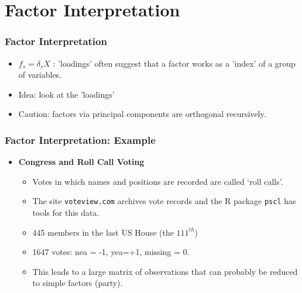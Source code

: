 \documentclass[
  shownotes,
  xcolor={svgnames},
  hyperref={colorlinks,citecolor=DarkBlue,linkcolor=DarkRed,urlcolor=DarkBlue}
  , aspectratio=169]{beamer}
\newcommand{\theme}{\color{andesred}}
\newcommand{\gr}{\color{black!60}}
\newcommand{\nv}{\color{Navy}}
\begin{document}
\section{Factor Interpretation}
\begin{frame}
\frametitle{Factor Interpretation}

\begin{itemize}
\item $f_s = \delta_s X$ : 'loadings' often suggest that a factor works as a 'index' of a group of variables.
\bigskip
\item Idea: look at the 'loadings'
\bigskip
\item Caution: factors via principal components are orthogonal recursively.
\end{itemize}


\end{frame}


\begin{frame}[fragile]
\frametitle{Factor Interpretation: Example}


\begin{itemize}
\item {\bf Congress and \theme Roll Call Voting}
\bigskip
\begin{itemize}
  \item Votes in which names and positions are recorded are called `roll calls'.
  \medskip
  \item The site {\tt voteview.com} archives vote records and the R package { \tt pscl} has tools for this data.
  \medskip
  \item 445 members in the last US House  (the $111^{th}$)
  \medskip
  \item 1647 votes:  \theme nea = -1, \nv yea=+1, \gr missing = 0.
  \medskip
  \item This leads to a large matrix of observations that can probably be reduced to simple factors {\gr (party)}.
\end{itemize}
\end{itemize}





\end{frame}
\end{document}
